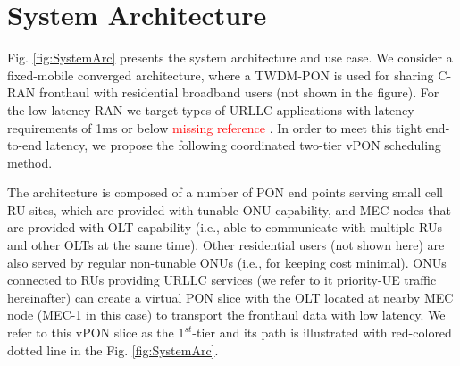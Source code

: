 \documentclass[a4paper, oneside, twocolumn, notitlepage, 10pt]{extarticle_ecoc}
\begin{document}
\section{System Architecture} \label{sec:SystemModel}
	Fig. \ref{fig:SystemArc} presents the system architecture and use case. We consider a fixed-mobile converged architecture, where a TWDM-PON is used for sharing C-RAN fronthaul with residential broadband users (not shown in the figure). For the low-latency RAN we target types of URLLC applications with latency requirements of 1ms or below \textcolor{red}{missing reference} \cite{NGMN_URLLC_use_case}. In order to meet this tight end-to-end latency, we propose the following coordinated two-tier vPON scheduling method.
	
	The architecture is composed of a number of PON end points serving small cell RU sites, which are provided with tunable ONU capability, and MEC nodes that are provided with OLT capability (i.e., able to communicate with multiple RUs and other OLTs at the same time). Other residential users (not shown here) are also served by regular non-tunable ONUs (i.e., for keeping cost minimal). %
	ONUs connected to RUs providing URLLC services (we refer to it priority-UE traffic hereinafter) can create a virtual PON slice with the OLT located at nearby MEC node (MEC-1 in this case) to transport the fronthaul data with low latency. We refer to this vPON slice as the $1^{st}$-tier and its path is illustrated with red-colored dotted line in the Fig. \ref{fig:SystemArc}.
	
\end{document}
